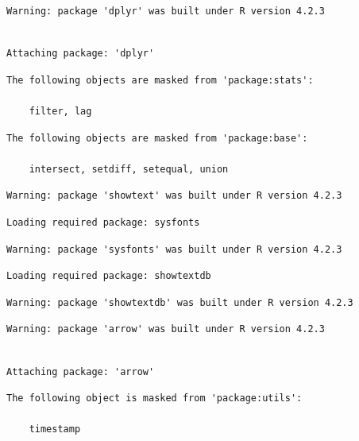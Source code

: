\documentclass[
  letterpaper,
  DIV=11,
  numbers=noendperiod]{scrartcl}
\begin{document}
\begin{verbatim}
Warning: package 'dplyr' was built under R version 4.2.3
\end{verbatim}

\begin{verbatim}

Attaching package: 'dplyr'
\end{verbatim}

\begin{verbatim}
The following objects are masked from 'package:stats':

    filter, lag
\end{verbatim}

\begin{verbatim}
The following objects are masked from 'package:base':

    intersect, setdiff, setequal, union
\end{verbatim}

\begin{verbatim}
Warning: package 'showtext' was built under R version 4.2.3
\end{verbatim}

\begin{verbatim}
Loading required package: sysfonts
\end{verbatim}

\begin{verbatim}
Warning: package 'sysfonts' was built under R version 4.2.3
\end{verbatim}

\begin{verbatim}
Loading required package: showtextdb
\end{verbatim}

\begin{verbatim}
Warning: package 'showtextdb' was built under R version 4.2.3
\end{verbatim}

\begin{verbatim}
Warning: package 'arrow' was built under R version 4.2.3
\end{verbatim}

\begin{verbatim}

Attaching package: 'arrow'
\end{verbatim}

\begin{verbatim}
The following object is masked from 'package:utils':

    timestamp
\end{verbatim}
\end{document}
